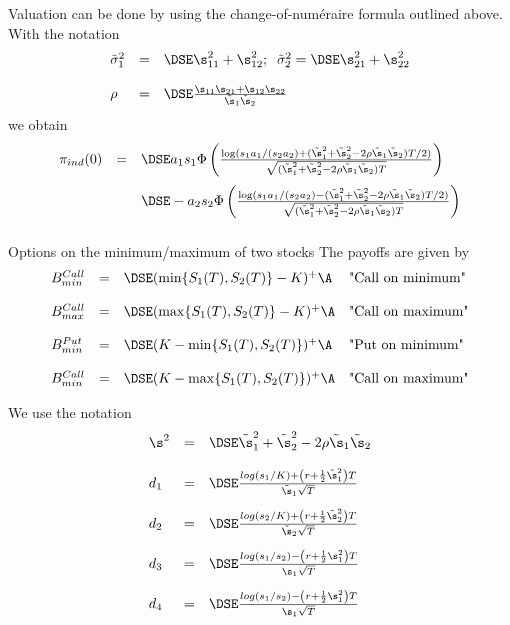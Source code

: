 	Valuation can be done by using the change-of-num\'{e}raire formula
	outlined above. With the notation
		$$
		\begin{array}{lll}
		\tilde{\sigma}_1^2 &=&\DSE \s_{11}^2 + \s_{12}^2; \;\;
		\tilde{\sigma}_2^2 =\DSE \s_{21}^2 + \s_{22}^2\\*[12pt]
		\rho &=&\DSE \frac{\s_{11}\s_{21} + \s_{12}\s_{22}}{\tilde{\s}_1\tilde{\s}_2}
		\end{array}
		$$
	we obtain
		$$
		\begin{array}{lll}
		\pi_{ind}(0) &=&\DSE a_1s_1 \Phi\left(
		\frac{\log(s_1a_1/(s_2a_2) +(\tilde{\s}_1^2+\tilde{\s}_2^2-2\rho \tilde{\s}_1\tilde{\s}_2)T/2)}
		{\sqrt{(\tilde{\s}_1^2+\tilde{\s}_2^2-2\rho \tilde{\s}_1\tilde{\s}_2)T}}   \right)\\*[12pt]
		&&\DSE - a_2s_2 \Phi\left(
		\frac{\log(s_1a_1/(s_2a_2)-(\tilde{\s}_1^2+\tilde{\s}_2^2-2\rho \tilde{\s}_1\tilde{\s}_2)T/2)}
		{\sqrt{(\tilde{\s}_1^2+\tilde{\s}_2^2-2\rho \tilde{\s}_1\tilde{\s}_2)T}}   \right)\\*[12pt]
		\end{array}
		$$

Options on the minimum/maximum of two stocks
	The payoffs are given by
		$$
		\begin{array}{llll}
		B_{min}^{Call} &=&\DSE (\min\{S_1(T),S_2(T)\}-K)^+ \A &\mbox{"Call on minimum"}\\*[12pt]
		B_{max}^{Call} &=&\DSE (\max\{S_1(T),S_2(T)\}-K)^+ \A &\mbox{"Call on maximum"}\\*[12pt]
		B_{min}^{Put} &=&\DSE (K-\min\{S_1(T),S_2(T)\})^+ \A &\mbox{"Put on minimum"}\\*[12pt]
		B_{min}^{Call} &=&\DSE (K-\max\{S_1(T),S_2(T)\})^+ \A &\mbox{"Call on maximum"}
		\end{array}
		$$
	
	We use the notation
		$$
		\begin{array}{lll}
		\s^2 &=&\DSE \tilde{\s}_1^2+\tilde{\s}_2^2-2\rho \tilde{\s}_1\tilde{\s}_2\\*[12pt]
		d_1 &=& \DSE \frac{log(s_1/K) +\left(r+\frac{1}{2}\tilde{\s}_1^2\right)T}{\tilde{\s}_1\sqrt{T}}\\*[12pt]
		d_2 &=& \DSE \frac{log(s_2/K) +\left(r+\frac{1}{2}\tilde{\s}_2^2\right)T}{\tilde{\s}_2\sqrt{T}}\\*[12pt]
		d_3 &=& \DSE \frac{log(s_1/s_2) -\left(r+\frac{1}{2}\s_1^2\right)T}{\s_1\sqrt{T}}\\*[12pt]
		d_4 &=& \DSE \frac{log(s_1/s_2) -\left(r+\frac{1}{2}\s_1^2\right)T}{\s_1\sqrt{T}}\\*[12pt]
		\end{array}
		$$

